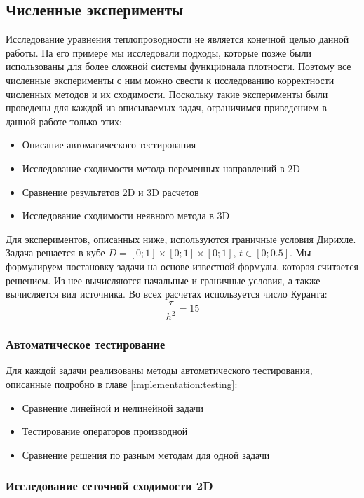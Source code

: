 \subsection{Численные эксперименты}
Исследование уравнения теплопроводности не является конечной целью данной работы. На его примере мы исследовали подходы, которые позже были использованы для более сложной системы функционала плотности. Поэтому все численные эксперименты с ним можно свести к исследованию корректности численных методов и их сходимости. Поскольку такие  эксперименты были проведены для каждой из описываемых задач, ограничимся приведением в данной работе только этих:
\begin{itemize}
\item Описание автоматического тестирования
\item Исследование сходимости метода переменных направлений в 2D
\item Сравнение результатов 2D и 3D расчетов
\item Исследование сходимости неявного метода в 3D
\end{itemize}
Для экспериментов, описанных ниже, используются граничные условия Дирихле. Задача решается в кубе $D = [0; 1]\times [0;1] \times [0;1]$, $t \in [0; 0.5]$. Мы формулируем постановку задачи на основе известной формулы, которая считается решением. Из нее вычисляются начальные и граничные условия, а также вычисляется вид источника. Во всех расчетах используется число Куранта:
\begin{equation}
\frac{\tau}{h^2} = 15
\end{equation}

\subsubsection{Автоматическое тестирование}
Для каждой задачи реализованы методы автоматического тестирования, описанные подробно в главе \ref{implementation:testing}:
\begin{itemize}
\item Сравнение линейной и нелинейной задачи
\item Тестирование операторов производной
\item Сравнение решения по разным методам для одной задачи
\end{itemize}

\subsubsection{Исследование сеточной сходимости 2D}
